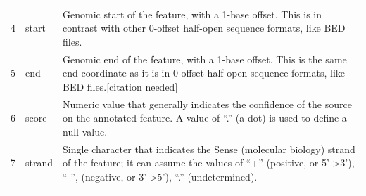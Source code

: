 \documentclass[]{book}
\begin{document}
\begin{longtable}[]{@{}lll@{}}
\begin{minipage}[t]{0.03\columnwidth}\raggedright
4\strut
\end{minipage} & \begin{minipage}[t]{0.03\columnwidth}\raggedright
start\strut
\end{minipage} & \begin{minipage}[t]{0.85\columnwidth}\raggedright
Genomic start of the feature, with a 1-base offset. This is in contrast with other 0-offset half-open sequence formats, like BED files.\strut
\end{minipage}\tabularnewline
\begin{minipage}[t]{0.03\columnwidth}\raggedright
5\strut
\end{minipage} & \begin{minipage}[t]{0.03\columnwidth}\raggedright
end\strut
\end{minipage} & \begin{minipage}[t]{0.85\columnwidth}\raggedright
Genomic end of the feature, with a 1-base offset. This is the same end coordinate as it is in 0-offset half-open sequence formats, like BED files.{[}citation needed{]}\strut
\end{minipage}\tabularnewline
\begin{minipage}[t]{0.03\columnwidth}\raggedright
6\strut
\end{minipage} & \begin{minipage}[t]{0.03\columnwidth}\raggedright
score\strut
\end{minipage} & \begin{minipage}[t]{0.85\columnwidth}\raggedright
Numeric value that generally indicates the confidence of the source on the annotated feature. A value of ``.'' (a dot) is used to define a null value.\strut
\end{minipage}\tabularnewline
\begin{minipage}[t]{0.03\columnwidth}\raggedright
7\strut
\end{minipage} & \begin{minipage}[t]{0.03\columnwidth}\raggedright
strand\strut
\end{minipage} & \begin{minipage}[t]{0.85\columnwidth}\raggedright
Single character that indicates the Sense (molecular biology) strand of the feature; it can assume the values of ``+'' (positive, or 5'-\textgreater{}3'), ``-'', (negative, or 3'-\textgreater{}5'), ``.'' (undetermined).\strut
\end{minipage}\tabularnewline
\begin{minipage}[t]{0.03\columnwidth}\raggedright

\end{minipage}
\end{longtable}
\end{document}
